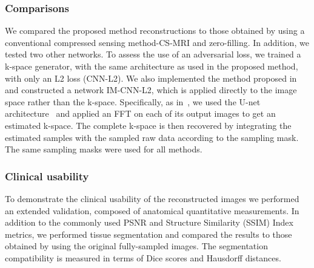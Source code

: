 \documentclass[10pt,journal,compsoc]{IEEEtran}
\begin{document}
\subsubsection*{\bf Comparisons}
We compared the proposed method reconstructions to those obtained by using a conventional compressed sensing method-CS-MRI \cite{lustig2007sparse} and zero-filling. In addition, we tested two other networks. To assess the use of an adversarial loss, we trained a k-space generator, with the same architecture as used in the proposed method, with only an L2 loss (CNN-L2). We also implemented the method proposed in~\cite{hyun2017deep} and constructed a network IM-CNN-L2, which is applied directly to the image space rather than the k-space. Specifically, as in~\cite{hyun2017deep}, we used the U-net architecture~\cite{ronneberger2015u} and applied an FFT on each of its output images to get an estimated k-space. The complete k-space is then recovered by integrating the estimated samples with the sampled raw data according to the sampling mask. The same sampling masks were used for all methods.

\subsubsection*{\bf Clinical usability}
To demonstrate the clinical usability of the reconstructed images we performed an extended validation, composed of anatomical quantitative measurements. In addition to the commonly used PSNR and Structure Similarity (SSIM) Index~\cite{wang2004image} metrics, we performed tissue segmentation and compared the results to those obtained by using the original fully-sampled images. The segmentation compatibility is measured in terms of Dice scores and Hausdorff distances.
\end{document}

